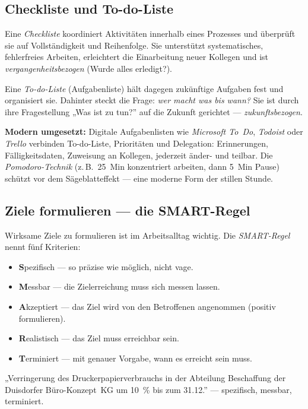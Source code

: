 \documentclass[11pt, a4paper]{article}
\begin{document}
\subsection{Checkliste und To-do-Liste}

Eine \emph{Checkliste} koordiniert Aktivitäten innerhalb eines Prozesses und überprüft
sie auf Vollständigkeit und Reihenfolge. Sie unterstützt systematisches, fehlerfreies
Arbeiten, erleichtert die Einarbeitung neuer Kollegen und ist
\emph{vergangenheitsbezogen} (Wurde alles erledigt?).

Eine \emph{To-do-Liste} (Aufgabenliste) hält dagegen zukünftige Aufgaben fest und
organisiert sie. Dahinter steckt die Frage: \emph{wer macht was bis wann?} Sie ist durch
ihre Fragestellung „Was ist zu tun?” auf die Zukunft gerichtet ---
\emph{zukunftsbezogen}.

\begin{beispiel}
\textbf{Modern umgesetzt:} Digitale Aufgabenlisten wie \emph{Microsoft To~Do},
\emph{Todoist} oder \emph{Trello} verbinden To-do-Liste, Prioritäten und Delegation:
Erinnerungen, Fälligkeitsdaten, Zuweisung an Kollegen, jederzeit änder- und teilbar. Die
\emph{Pomodoro-Technik} (z.\,B.\ 25~Min konzentriert arbeiten, dann 5~Min Pause) schützt
vor dem Sägeblatteffekt --- eine moderne Form der stillen Stunde.
\end{beispiel}

\subsection{Ziele formulieren --- die SMART-Regel}

Wirksame Ziele zu formulieren ist im Arbeitsalltag wichtig. Die \emph{SMART-Regel} nennt
fünf Kriterien:

\begin{itemize}
  \item \textbf{S}pezifisch --- so präzise wie möglich, nicht vage.
  \item \textbf{M}essbar --- die Zielerreichung muss sich messen lassen.
  \item \textbf{A}kzeptiert --- das Ziel wird von den Betroffenen angenommen (positiv formulieren).
  \item \textbf{R}ealistisch --- das Ziel muss erreichbar sein.
  \item \textbf{T}erminiert --- mit genauer Vorgabe, wann es erreicht sein muss.
\end{itemize}

\begin{beispiel}
„Verringerung des Druckerpapierverbrauchs in der Abteilung Beschaffung der Duisdorfer
Büro-Konzept~KG um 10~\% bis zum 31.12.” --- spezifisch, messbar, terminiert.
\end{beispiel}
\end{document}
